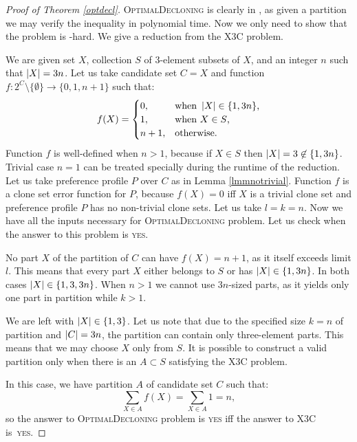 \begin{proof}[Proof of Theorem \ref{optdecl}]
\textsc{OptimalDecloning} is clearly in \np,
as given a partition we may verify the inequality in polynomial time.
Now we only need to show that the problem is \np-hard.
We give a reduction from the \textsc{X3C} problem.

We are given set $X$, collection $S$ of 3-element subsets of $X$, and an integer $n$ such that $\left\vert X \right\vert = 3n$.
Let us take candidate set $C = X$
and function $f:2^C \setminus \{\emptyset\} \rightarrow \{0,1,n+1\}$ such that:
$$ f(X) =
\begin{cases}
0, &\text{when } \left\vert X \right\vert \in \{1,3n\} \text{,} \\
1, &\text{when }  X \in S \text{,} \\
n+1, &\text{otherwise.}
\end{cases}
$$
Function $f$ is well-defined when $n>1$, because if $X \in S$ then $\left\vert X \right\vert = 3 \not\in \{1,3n\}$.
Trivial case $n=1$ can be treated specially during the runtime of the reduction.
Let us take preference profile $P$ over $C$ as in Lemma \ref{lmmnotrivial}.
Function $f$ is a clone set error function for $P$, because $f(X) = 0$ iff $X$ is a trivial clone set
and preference profile $P$ has no non-trivial clone sets.
Let us take $l=k=n$.
Now we have all the inputs necessary for \textsc{OptimalDecloning} problem.
Let us check when the answer to this problem is \textsc{yes}.

No part $X$ of the partition of $C$ can have $f(X)=n+1$, as it itself exceeds limit $l$.
This means that every part $X$ either belongs to $S$ or has $\left\vert X \right\vert \in \{1,3n\}$.
In both cases $\left\vert X \right\vert \in \{1,3,3n\}$.
When $n>1$ we cannot use $3n$-sized parts,
as it yields only one part in partition while $k>1$.

We are left with $\left\vert X \right\vert \in \{1,3\}$.
Let us note that due to the specified size $k=n$ of partition and $\left\vert C \right\vert = 3n$,
the partition can contain only three-element parts.
This means that we may choose $X$ only from $S$.
It is possible to construct a valid partition only when there is an $A \subset S$ satisfying the \textsc{X3C} problem.

In this case, we have partition $A$ of candidate set $C$ such that:
$$ \sum_{X \in A} f(X) = \sum_{X \in A} 1 = n,$$
so the answer to \textsc{OptimalDecloning} problem is \textsc{yes}
iff the answer to \textsc{X3C} is~\textsc{yes}.
\end{proof}



